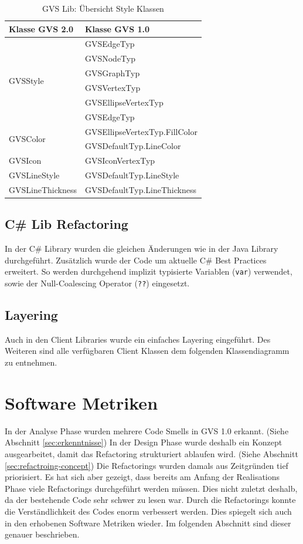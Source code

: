 \documentclass[11pt,a4paper,english,oneside]{book}
\numberwithin{equation}{chapter}
\begin{document}
	\begin{table}[h!]
		\centering
		\begin{tabularx}{\linewidth}{X X}
			\toprule 
			Klasse GVS 2.0 & Klasse GVS 1.0\\
			\midrule
			\multirow{6}{*}{GVSStyle} & 
			GVSEdgeTyp \\ & 
			GVSNodeTyp \\ & 
			GVSGraphTyp  \\ &
			GVSVertexTyp  \\ &
			GVSEllipseVertexTyp \\ &
			GVSEdgeTyp \\
			\midrule
			\multirow{2}{*}{GVSColor} & GVSEllipseVertexTyp.FillColor \\ &
			GVSDefaultTyp.LineColor \\
			\midrule
			GVSIcon & GVSIconVertexTyp \\
			\midrule
			GVSLineStyle & GVSDefaultTyp.LineStyle \\
			\midrule
			GVSLineThickness & GVSDefaultTyp.LineThickness \\
			\bottomrule 
		\end{tabularx} 
		\caption{GVS Lib: Übersicht Style Klassen} 
		\label{tbl:styles}
	\end{table}
	
	\subsection{C\# Lib Refactoring}
	In der C\# Library wurden die gleichen Änderungen wie in der Java Library durchgeführt. Zusätzlich wurde der Code um aktuelle C\# Best Practices erweitert. So werden durchgehend implizit typisierte Variablen (\lstinline|var|) verwendet, sowie der Null-Coalescing Operator (\lstinline|??|) eingesetzt. 
	
	\subsection{Layering}
	Auch in den Client Libraries wurde ein einfaches Layering eingeführt. Des Weiteren sind alle verfügbaren Client Klassen dem folgenden Klassendiagramm zu entnehmen.
	
	
	\section{Software Metriken} \label{sec:metrics-2}
	In der Analyse Phase wurden mehrere Code Smells in GVS 1.0 erkannt. (Siehe Abschnitt \ref{sec:erkenntnisse}) In der Design Phase wurde deshalb ein Konzept ausgearbeitet, damit das Refactoring strukturiert ablaufen wird. (Siehe Abschnitt \ref{sec:refactroing-concept}) Die Refactorings wurden damals aus Zeitgründen tief priorisiert. Es hat sich aber gezeigt, dass bereits am Anfang der Realisations Phase viele Refactorings durchgeführt werden müssen. Dies nicht zuletzt deshalb, da der bestehende Code sehr schwer zu lesen war. Durch die Refactorings konnte die Verständlichkeit des Codes enorm verbessert werden. Dies spiegelt sich auch in den erhobenen Software Metriken wieder. Im folgenden Abschnitt sind dieser genauer beschrieben.
	
\end{document}
